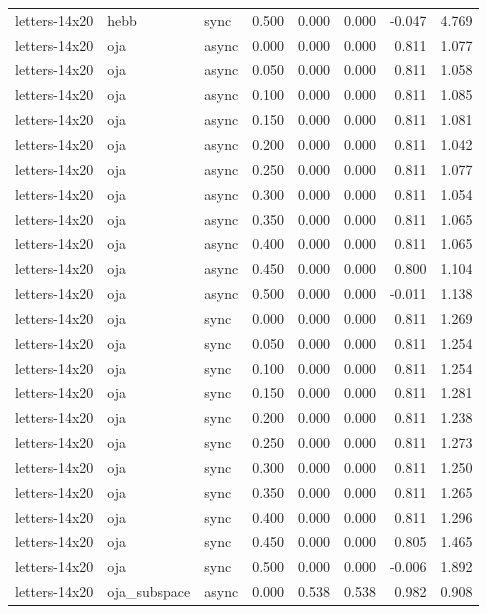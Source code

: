 \begin{tabular}{lllrrrrr}
letters-14x20 & hebb & sync & 0.500 & 0.000 & 0.000 & -0.047 & 4.769 \\
letters-14x20 & oja & async & 0.000 & 0.000 & 0.000 & 0.811 & 1.077 \\
letters-14x20 & oja & async & 0.050 & 0.000 & 0.000 & 0.811 & 1.058 \\
letters-14x20 & oja & async & 0.100 & 0.000 & 0.000 & 0.811 & 1.085 \\
letters-14x20 & oja & async & 0.150 & 0.000 & 0.000 & 0.811 & 1.081 \\
letters-14x20 & oja & async & 0.200 & 0.000 & 0.000 & 0.811 & 1.042 \\
letters-14x20 & oja & async & 0.250 & 0.000 & 0.000 & 0.811 & 1.077 \\
letters-14x20 & oja & async & 0.300 & 0.000 & 0.000 & 0.811 & 1.054 \\
letters-14x20 & oja & async & 0.350 & 0.000 & 0.000 & 0.811 & 1.065 \\
letters-14x20 & oja & async & 0.400 & 0.000 & 0.000 & 0.811 & 1.065 \\
letters-14x20 & oja & async & 0.450 & 0.000 & 0.000 & 0.800 & 1.104 \\
letters-14x20 & oja & async & 0.500 & 0.000 & 0.000 & -0.011 & 1.138 \\
letters-14x20 & oja & sync & 0.000 & 0.000 & 0.000 & 0.811 & 1.269 \\
letters-14x20 & oja & sync & 0.050 & 0.000 & 0.000 & 0.811 & 1.254 \\
letters-14x20 & oja & sync & 0.100 & 0.000 & 0.000 & 0.811 & 1.254 \\
letters-14x20 & oja & sync & 0.150 & 0.000 & 0.000 & 0.811 & 1.281 \\
letters-14x20 & oja & sync & 0.200 & 0.000 & 0.000 & 0.811 & 1.238 \\
letters-14x20 & oja & sync & 0.250 & 0.000 & 0.000 & 0.811 & 1.273 \\
letters-14x20 & oja & sync & 0.300 & 0.000 & 0.000 & 0.811 & 1.250 \\
letters-14x20 & oja & sync & 0.350 & 0.000 & 0.000 & 0.811 & 1.265 \\
letters-14x20 & oja & sync & 0.400 & 0.000 & 0.000 & 0.811 & 1.296 \\
letters-14x20 & oja & sync & 0.450 & 0.000 & 0.000 & 0.805 & 1.465 \\
letters-14x20 & oja & sync & 0.500 & 0.000 & 0.000 & -0.006 & 1.892 \\
letters-14x20 & oja\_subspace & async & 0.000 & 0.538 & 0.538 & 0.982 & 0.908 \\

\end{tabular}
